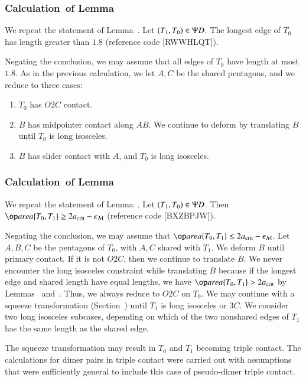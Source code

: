 \subsubsection{Calculation~of Lemma~} \label{sec:pseudo2}

We repeat the statement of Lemma~.
Let $(T_1,T_0)\in \Psi D$.  The longest edge of $T_0$
has length greater than $1.8$ (reference code [RWWHLQT]).


Negating the conclusion, we may assume that all edges of $T_0$ have
length at most $1.8$.  As in the previous calculation, we let $A,C$ be
the shared pentagons, and we reduce to three cases:
\begin{enumerate}
\item $T_0$ has $O2C$ contact.
\item $B$ has midpointer contact along $AB$.  We continue to deform by
  translating $B$ until $T_0$ is long isosceles.
\item $B$ has slider contact with $A$, and $T_0$ is long isosceles.
\end{enumerate}

\subsubsection{Calculation~of Lemma~} \label{sec:pseudo-area}

We repeat the statement of Lemma~.
Let $(T_1,T_0)\in\Psi D$.  Then $\area\{T_0,T_1\} \ge 2\acrit - \epsM$
(reference code [BXZBPJW]).

Negating the conclusion, we may assume that $\area\{T_0,T_1\}\le
2\acrit - \epsM$.  Let $A,B,C$ be the pentagons of $T_0$, with $A,C$
shared with $T_1$.  We deform $B$ until primary contact.  If it is not
$O2C$, then we continue to translate $B$.  We never encounter the long
isosceles constraint while translating $B$ because if the longest edge
and shared length have equal lengths, we have $\area\{T_0,T_1\} >
2\acrit$ by Lemmas~ and~.  Thus,
we always reduce to $O2C$ on $T_0$.  We may continue with a squeeze
transformation (Section~) until $T_1$ is long
isosceles or $3C$.  We consider two long isosceles subcases, depending
on which of the two nonshared edges of $T_1$ has the same length as the
shared edge.

The squeeze transformation may result in $T_0$ and $T_1$ becoming
triple contact.  The calculations for dimer pairs in triple contact
were carried out with assumptions that were sufficiently general to
include this case of pseudo-dimer triple contact.

